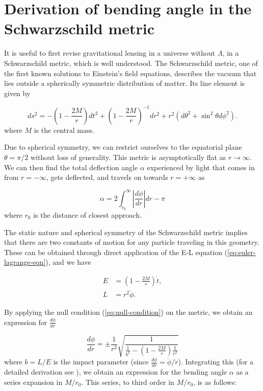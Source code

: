 \section{Derivation of bending angle in the Schwarzschild metric}

It is useful to first revise gravitational lensing in a universe without $\Lambda$, in a Schwarzschild metric, which is well understood. The Schwarzschild metric, one of the first known solutions to Einstein's field equations, describes the vacuum that lies outside a spherically symmetric distribution of matter. Its line element is given by

\begin{equation}
  ds^2 = -\left ( 1- \frac{2M}{r} \right ) dt^2 + \left ( 1 - \frac{2M}{r}\right )^{-1} dr^2 + r^2(d\theta^2 + \sin^2\theta d \phi^2).
  \label{eq:schwarzschild-metric}
\end{equation}
where $M$ is the central mass. 

Due to spherical symmetry, we can restrict ourselves to the equatorial plane $\theta = \pi/2$ without loss of generality. This metric is asymptotically flat as $r \rightarrow \infty$. We can then find the total deflection angle $\alpha$ experienced by light that comes in from $r=-\infty$, gets deflected, and travels on towards $r=+\infty$ as 

\begin{equation}
  \alpha = 2 \int_{r_0}^{\infty} \left |  \frac{d\phi}{dr} \right | dr - \pi
\end{equation}
where $r_0$ is the distance of closest approach. 

The static nature and spherical symmetry of the Schwarzschild metric implies that there are two constants of motion for any particle traveling in this geometry. These can be obtained through direct application of the E-L equation (\autoref{eq:euler-lagrange-eqn}), and we have

\begin{subequations}
  \begin{align}
    E &= \left ( 1 - \frac{2M}{r} \right ) \dot{t},\\
    L &= r^2\dot{\phi}.
  \end{align}
  \label{eq:schwarzschild-constants}
\end{subequations}

By applying the null condition (\autoref{eq:null-condition}) on the metric, we obtain an expression for $\frac{d\phi}{dr}$

\begin{equation}
  \frac{d\phi}{dr} = \pm \frac{1}{r^2} \sqrt{\frac{1}{ \frac{1}{b^2} - \left (1- \frac{2M}{r} \right )\frac{1}{r^2} }}
  \label{eq:dphi-dr}
\end{equation}
where $b = L/E$ is the impact parameter (since $\frac{d\phi}{dr} = \dot{\phi}/\dot{r}$). Integrating this (for a detailed derivation see \cite{keeton2005formalism}), we obtain an expression for the bending angle $\alpha$ as a series expansion in $M/r_0$. This series, to third order in $M/r_0$, is as follows:

